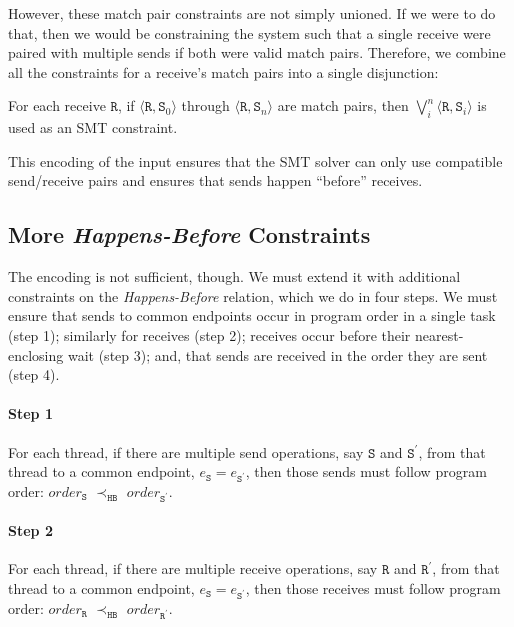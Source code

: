 However, these match pair constraints are not simply unioned. If we
were to do that, then we would be constraining the system such that a
single receive were paired with multiple sends if both were valid
match pairs. Therefore, we combine all the constraints for a receive's
match pairs into a single disjunction:

\begin{definition}
For each receive $\mathtt{R}$, if $\langle\mathtt{R},
\mathtt{S}_0\rangle$ through $\langle\mathtt{R}, \mathtt{S}_n\rangle$
are match pairs, then $\bigvee_{i}^{n} \langle\mathtt{R},
\mathtt{S}_i\rangle$ is used as an SMT constraint.
\end{definition}

This encoding of the input ensures that the SMT solver can only use
compatible send/receive pairs and ensures that sends happen ``before''
receives.

\subsection{More \emph{Happens-Before} Constraints}

The encoding is not sufficient, though. We must extend it with
additional constraints on the \emph{Happens-Before} relation, which we
do in four steps. We must ensure that sends to common endpoints occur
in program order in a single task (step 1); similarly for receives
(step 2); receives occur before their nearest-enclosing wait (step 3);
and, that sends are received in the order they are sent (step 4).

\paragraph*{Step 1} For each thread, if there are multiple send
operations, say $\mathtt{S}$ and $\mathtt{S^\prime}$, from that thread
to a common endpoint, $e_\mathtt{S} = e_\mathtt{S^\prime}$, then those
sends must follow program order: $\mathit{order}_\mathtt{S}$
$\prec_\mathtt{HB}$ $\mathit{order}_\mathtt{S^\prime}$.

\paragraph*{Step 2} For each thread, if there are multiple receive
operations, say $\mathtt{R}$ and $\mathtt{R^\prime}$, from that thread
to a common endpoint, $e_\mathtt{S} = e_\mathtt{S^\prime}$, then those
receives must follow program order: $\mathit{order}_\mathtt{R}$
$\prec_\mathtt{HB}$ $\mathit{order}_\mathtt{R^\prime}$.

